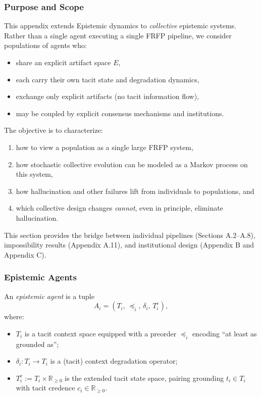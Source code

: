 

\subsubsection{ Purpose and Scope}

This appendix extends  Epistemic dynamics to \emph{collective} epistemic
systems. Rather than a single agent executing a single FRFP pipeline, we
consider populations of agents who:

\begin{itemize}
  \item share an explicit artifact space $E$,
  \item each carry their own tacit state and degradation dynamics,
  \item exchange only explicit artifacts (no tacit information flow),
  \item may be coupled by explicit consensus mechanisms and institutions.
\end{itemize}

The objective is to characterize:

\begin{enumerate}
  \item how to view a population as a single large FRFP system,
  \item how stochastic collective evolution can be modeled as a Markov process
        on this system,
  \item how hallucination and other failures lift from individuals to
        populations, and
  \item which collective design changes \emph{cannot}, even in principle,
        eliminate hallucination.
\end{enumerate}

This section provides the bridge between individual pipelines (Sections A.2–A.8),
impossibility results (Appendix A.11), and institutional design (Appendix B and Appendix C).

\subsubsection{Epistemic Agents}

\begin{definition}
An \emph{epistemic agent} is a tuple
\[
  A_i = (T_i, \,\preceq_i, \,\delta_i, \,T^e_i),
\]
where:
\begin{itemize}
  \item $T_i$ is a tacit context space equipped with a preorder
        $\preceq_i$ encoding ``at least as grounded as'';
  \item $\delta_i : T_i \to T_i$ is a (tacit) context degradation operator;
  \item $T^e_i := T_i \times \mathbb{R}_{\ge 0}$ is the extended tacit state
        space, pairing grounding $t_i \in T_i$ with tacit credence
        $c_i \in \mathbb{R}_{\ge 0}$.
\end{itemize}
\end{definition}


